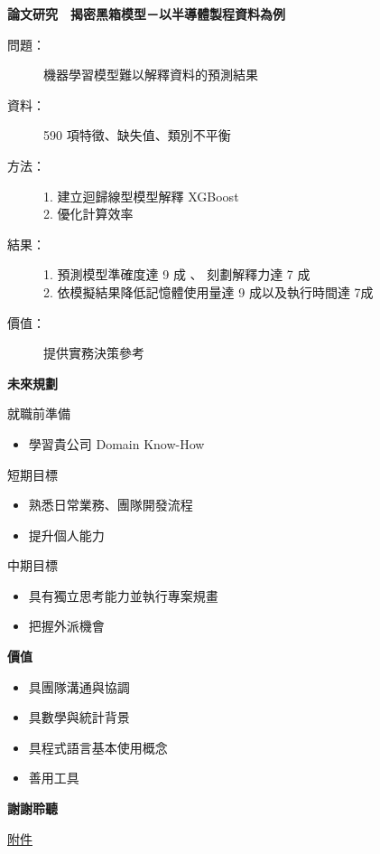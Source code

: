 \documentclass[12pt,aspectratio=169]{beamer}
\begin{document}
\begin{frame}{\textbf{論文研究　揭密黑箱模型－以半導體製程資料為例}}
  \begin{description}
    \item[問題：] 機器學習模型難以解釋資料的預測結果
    \vspace{1em}
    \item[資料：] 590 項特徵、缺失值、類別不平衡
    \vspace{1em}
    \item[方法：] 1. 建立迴歸線型模型解釋 XGBoost \\ 2. 優化計算效率
    \vspace{1em}
    \item[結果：] 1. 預測模型準確度達 9 成 、 刻劃解釋力達 7 成 \\ 2. 依模擬結果降低記憶體使用量達 9 成以及執行時間達 7成
    \vspace{1em}
    \item[價值：] 提供實務決策參考
  \end{description}
\end{frame}

\begin{frame}{\textbf{未來規劃}}
  \begin{block}{就職前準備}
    \begin{itemize}
      \item 學習貴公司 Domain Know-How
    \end{itemize}
  \end{block}
  \begin{block}{短期目標}
    \begin{itemize}
      \item 熟悉日常業務、團隊開發流程
      \item 提升個人能力
    \end{itemize}
  \end{block}
  \begin{block}{中期目標}
    \begin{itemize}
      \item 具有獨立思考能力並執行專案規畫
      \item 把握外派機會
    \end{itemize}
  \end{block}
\end{frame}

\begin{frame}{\textbf{價值}}
  \begin{itemize}
    \item 具團隊溝通與協調
    \vspace{1em}
    \item 具數學與統計背景
    \vspace{1em}
    \item 具程式語言基本使用概念
    \vspace{1em}
    \item 善用工具
  \end{itemize}
\end{frame}

\begin{frame}
  \vspace{3cm}
  \centering
  \Huge{\textbf{謝謝聆聽}}
  
  \vspace{3cm}
  \small\href{https://drive.google.com/file/d/1lE5E7IaBIESfK62EoWuBSgFOo_zypsXs/view?usp=sharing}{附件}
\end{frame}
\end{document}
